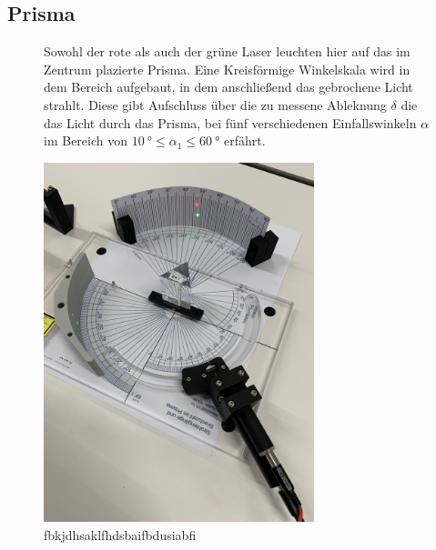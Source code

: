 \subsection{Prisma}
\begin{figure}
    \begin{minipage}{0.5\textwidth}
Sowohl der rote als auch der grüne Laser leuchten hier auf das im Zentrum plazierte Prisma.
Eine Kreisförmige Winkelskala wird in dem Bereich aufgebaut, in dem anschließend das gebrochene Licht strahlt. Diese gibt Aufschluss
über die zu messene Ableknung $\delta$ die das Licht durch das Prisma, bei fünf verschiedenen Einfallswinkeln $\alpha$ im Bereich von 
$\SI{10}{\degree} \leq \alpha_1 \leq \SI{60}{\degree}$ erfährt.
\end{minipage}
\hfill
\begin{minipage}{0.5\textwidth}
        \centering
        \includegraphics[width=0.7\textwidth]{bilder/prisma.jpg}
        \caption{fbkjdhsaklfhdsbaifbdusiabfi}
    \end{minipage}
\end{figure}

